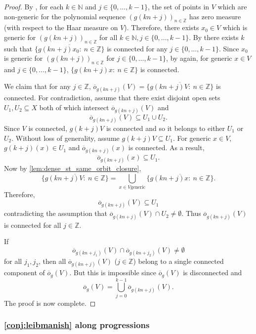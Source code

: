 \documentclass{article}
\theoremstyle{plain}
\theoremstyle{claim}
\theoremstyle{definition}
\theoremstyle{plain}
\theoremstyle{plain}
\newcommand{\N}{\mathbb{N}}
\newcommand{\Z}{\mathbb{Z}}
\newcommand{\1}{\boldsymbol{1}}
\newcommand{\orb}{\overline{o}}
\begin{document}
\begin{proof}
By \cite[Theorem 1.13]{Leibman07}, for each $k \in \N$ and $j \in \{0, \ldots, k - 1\}$, the set of points in $V$ which are non-generic for the polynomial sequence $(g(kn + j))_{n \in \Z}$ has zero measure (with respect to the Haar measure on $V$). 
Therefore, there exists $x_0 \in V$ which is generic for $(g(kn + j))_{n \in \Z}$ for all $k \in \N, j \in \{0, \ldots, k - 1\}$. 
By \cite[Theorem B]{Leibman05a}  there exists $k$ such that $\overline{\{g(kn + j) x_0: \ n \in \Z\}}$ is connected for any $j \in \{0, \ldots, k - 1\}$. Since $x_0$ is generic for $(g(k n + j))_{n \in \Z}$ for $j \in \{0, \ldots, k - 1\}$, by \cite[Theorem 1.13]{Leibman07} again, for generic $x \in V$ and $j \in \{0, \ldots, k - 1\}$, $\{g(k n + j) x: \ n \in \Z\}$ is connected. 



We claim that for any $j \in \Z$, $\orb_{g(kn + j)}(V) = \overline{\{g(kn + j) V: \ n \in \Z\}}$ is connected. 
For contradiction, assume that there exist disjoint open sets $U_1, U_2 \subseteq X$ both of which intersect $\orb_{g(kn + j)} (V)$ and
\[
    \orb_{g(kn + j)}(V)  \subseteq U_1 \cup U_2.
\]
Since $V$ is connected, $g(k + j) V$  is connected and so it belongs to either $U_1$ or $U_2$. 
Without loss of generality, assume $g(k+j) V \subseteq U_1$. For generic $x \in V$, $g(k+j)(x) \in U_1$ and $\orb_{g(kn + j)} (x)$ is connected. 
As a result, 
\[
    \orb_{g(kn + j)}(x) \subseteq U_1.
\]
Now by \cref{lem:dense_st_same_orbit_closure},
\[
    \overline{\{g(kn + j) V: \ n \in \Z\}} = \bigcup_{x \in V \text{generic}} \overline{\{g(kn + j) x: \ n \in \Z\}}.
\]
Therefore, 
\[
    \orb_{g(kn + j)}(V)  \subseteq U_1  
\]
contradicting the assumption that $ \orb_{g(kn + j)}(V) \cap U_2 \neq \emptyset$. Thus $\orb_{g(kn + j)}(V)$ is connected for all $j \in \Z$.

If 
\[
    \orb_{g(kn + j_1)} (V) \cap \orb_{g(kn + j_2)} (V) \neq \emptyset
\]
for all $j_1, j_2$, then all $\orb_{g(kn + j)}(V)$ ($j \in \Z$) belong to a single connected component of $\orb_g(V)$. But this is impossible since $\orb_g(V)$ is disconnected and
\[
    \orb_g(V) = \bigcup_{j=0}^{k-1} \orb_{g(kn + j)}(V).
\]
The proof is now complete.
\end{proof}








\subsubsection{\texorpdfstring{\cref{conj:leibmanish}}{Conjecture 1.4} along progressions}
\end{document}

